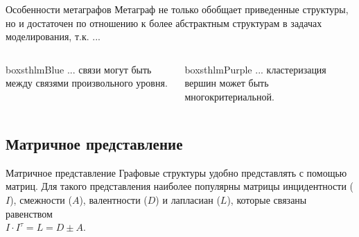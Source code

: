\documentclass{beamer}
\begin{document}
\begin{darkframes}

	\begin{frame}[label=lists]{Особенности метаграфов}
		\centering
		Метаграф не только обобщает приведенные структуры, но и достаточен по отношению к более абстрактным структурам в задачах моделирования, т.к. ...


		\vspace*{0.7cm}
			\begin{columns}[onlytextwidth]
				\begin{column}{0.48\columnwidth}
					\begin{beamercolorbox}[wd=\linewidth,ht=10ex,dp=3ex]{boxsthlmBlue}
					\centering
						... связи могут быть между связями произвольного уровня.
					\end{beamercolorbox}
				\end{column}

				\begin{column}{0.48\columnwidth}
				\centering

				\begin{beamercolorbox}[wd=\linewidth,ht=10ex,dp=3ex]{boxsthlmPurple}
					\centering
						... кластеризация вершин может быть многокритериальной.
					\end{beamercolorbox}
				\end{column}
			\end{columns}
	\end{frame}

	\subsection{Матричное представление}
		\begin{frame}[label=simmonshall]{Матричное представление}
		\centering
			Графовые структуры удобно представлять с помощью матриц. Для такого представления наиболее популярны матрицы \alert{инцидентности} ($I$), \alert{смежности} ($A$), \alert{валентности} ($D$) и \alert{лапласиан} ($L$), которые связаны равенством 
			\\$I \cdot I^{\tau} = L = D \pm A.$


\end{frame}
\end{darkframes}
\end{document}

